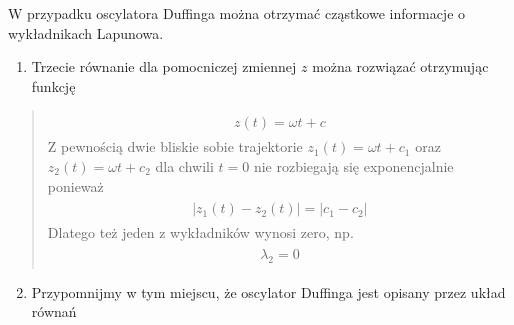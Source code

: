 \documentclass[a4paper,12pt,polish]{sphinxmanual}
\begin{document}
W przypadku oscylatora Duffinga można otrzymać cząstkowe  informacje o wykładnikach Lapunowa.
\begin{enumerate}
\item {} 
Trzecie równanie dla pomocniczej zmiennej $z$ można rozwiązać otrzymując funkcję

\end{enumerate}
\begin{quote}
\label{ch2/chII012:equation-eqn8}\begin{gather}
\begin{split}z(t) = \omega t + c\end{split}\label{ch2/chII012-eqn8}
\end{gather}
Z pewnością dwie bliskie sobie trajektorie $z_1(t) = \omega t+c_1$ oraz $z_2(t) = \omega t + c_2$ dla chwili   $t=0$ nie rozbiegają się exponencjalnie ponieważ
\label{ch2/chII012:equation-eqn9}\begin{gather}
\begin{split}|z_1(t) - z_2(t)| = |c_1 -c_2|\end{split}\label{ch2/chII012-eqn9}
\end{gather}
Dlatego też jeden z wykładników wynosi zero, np.
\label{ch2/chII012:equation-eqn10}\begin{gather}
\begin{split}\lambda_2 = 0\end{split}\label{ch2/chII012-eqn10}
\end{gather}\end{quote}
\begin{enumerate}
\setcounter{enumi}{1}
\item {} 
Przypomnijmy w tym miejscu, że oscylator Duffinga jest opisany przez układ równań

\end{enumerate}
\end{document}
